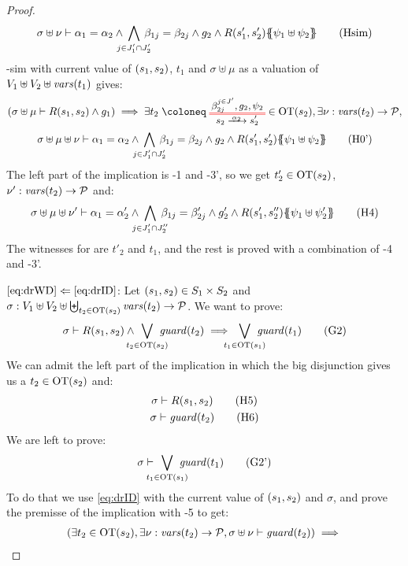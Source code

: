 \documentclass{article}
\begin{document}
\begin{proof}
\begin{multline}
		\sigma \uplus \nu \vdash \alpha_1 = \alpha_2 \wedge \bigwedge_\subbox{j \in J'_1 \cap J'_2} \beta_{1j} = \beta_{2j} \wedge g_2 \wedge R\mpar{s'_1, s'_2}\psubst{\psi_1 \uplus \psi_2} \hyp{sim}
	\end{multline}
	\hyp{sim} with current value of \({\left(s_1, s_2\right)}\), \(t_1\) and \(\sigma \uplus \mu\) as a valuation of \(V_1 \uplus V_2 \uplus \mathit{vars}{\left(t_1\right)}\) gives:
	\begin{multline}
		\mpar{\sigma \uplus \mu \vdash R\mpar{s_1, s_2} \wedge g_1} \implies \exists t_2 \defobject \OTx{2}{}{2}{} \in \fOT{s_2}, \exists \nu: \fvars{t_2} \to \values, \\
		\sigma \uplus \mu \uplus \nu \vdash \alpha_1 = \alpha_2 \wedge \bigwedge_\subbox{j \in J'_1 \cap J'_2} \beta_{1j} = \beta_{2j} \wedge g_2 \wedge R\mpar{s'_1, s'_2}\psubst{\psi_1 \uplus \psi_2} \hyp{0'}
	\end{multline}
	The left part of the implication is \hyp{1} and \hyp{3'}, so we get \(t'_2 \in \mathrm{OT}{\left(s_2\right)}\), \(\nu': \mathit{vars}{\left(t_2\right)} \to \mathcal{P}\) and:
	\[ \sigma \uplus \mu \uplus \nu' \vdash \alpha_1 = \alpha'_2 \wedge \bigwedge_\subbox{j \in J'_1 \cap J''_2} \beta_{1j} = \beta'_{2j} \wedge g'_2 \wedge R\mpar{s'_1, s''_2}\psubst{\psi_1 \uplus \psi'_2} \hyp{4} \]
	The witnesses for  are \(t'_2\) and \(t_1\), and the rest is proved with a combination of \hyp{4} and \hyp{3'}.
\item[\(\eqref{eq:drWD}\Leftarrow\eqref{eq:drID}\):]
	Let \({\left(s_1, s_2\right)} \in S_1 \times S_2\) and \(\sigma: V_1 \uplus V_2 \uplus \biguplus_{t_2 \in \mathrm{OT}{\left(s_2\right)}} \mathit{vars}{\left(t_2\right)} \to \mathcal{P}\).
	We want to prove:
	\[ \sigma \vdash R\mpar{s_1, s_2} \wedge \bigvee_\subbox{t_2 \in \fOT{s_2}} \fguard{t_2} \implies \bigvee_\subbox{t_1 \in \fOT{s_1}} \fguard{t_1} \goal{2} \]
	We can admit the left part of the implication in which the big disjunction gives us a \(t_2 \in \mathrm{OT}{\left(s_2\right)}\) and:
	\begin{gather}
		\sigma \vdash R\mpar{s_1, s_2} \hyp{5} \\
		\sigma \vdash \fguard{t_2} \hyp{6}
	\end{gather}
	We are left to prove:
	\[ \sigma \vdash \bigvee_\subbox{t_1 \in \fOT{s_1}} \fguard{t_1} \goal{2'} \]
	To do that we use \eqref{eq:drID} with the current value of \({\left(s_1, s_2\right)}\) and \(\sigma\), and prove the premisse of the implication with \hyp{5} to get:
	\begin{multline}
		\mpar{\exists t_2 \in \fOT{s_2}, \exists \nu: \fvars{t_2} \to \values, \sigma \uplus \nu \vdash \fguard{t_2}} \implies \\

\end{multline}
\end{proof}
\end{document}
